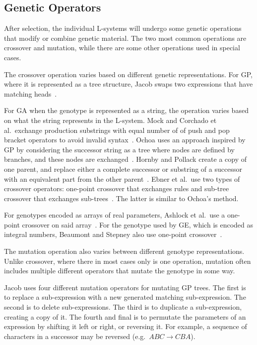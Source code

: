 \subsection{Genetic Operators}
After selection, the individual L-systems will undergo some genetic operations that modify or combine genetic material.
The two most common operations are crossover and mutation, while there are some other operations used in special cases.

The crossover operation varies based on different genetic representations.
For GP, where it is represented as a tree structure, Jacob swaps two expressions that have matching heads~\cite{1994Jacob,1995Jacob}.

For GA when the genotype is represented as a string, the operation varies based on what the string represents in the L-system.
Mock and Corchado et al.\ exchange production substrings with equal number of of push and pop bracket operators to avoid invalid syntax~\cite{1998Mock,2009Corchado}.
Ochoa uses an approach inspired by GP by considering the successor string as a tree where nodes are defined by branches, and these nodes are exchanged~\cite{1998Ochoa}.
Hornby and Pollack create a copy of one parent, and replace either a complete successor or substring of a successor with an equivalent part from the other parent~\cite{2001Hornby}.
Ebner et al.\ use two types of crossover operators: one-point crossover that exchanges rules and sub-tree crossover that exchanges sub-trees~\cite{2002Ebner,2003Ebner}.
The latter is similar to Ochoa's method.

For genotypes encoded as arrays of real parameters, Ashlock et al.\ use a one-point crossover on said array~\cite{2006Ashlock}.
For the genotype used by GE, which is encoded as integral numbers, Beaumont and Stepney also use one-point crossover~\cite{2009Beaumont}.

The mutation operation also varies between different genotype representations.
Unlike crossover, where there in most cases only is one operation, mutation often includes multiple different operators that mutate the genotype in some way.

Jacob uses four different mutation operators for mutating GP trees.
The first is to replace a sub-expression with a new generated matching sub-expression.
The second is to delete sub-expressions.
The third is to duplicate a sub-expression, creating a copy of it.
The fourth and final is to permutate the parameters of an expression by shifting it left or right, or reversing it.
For example, a sequence of characters in a successor may be reversed (e.g.\ $ABC \rightarrow CBA$).~\cite{1994Jacob, 1995Jacob}

